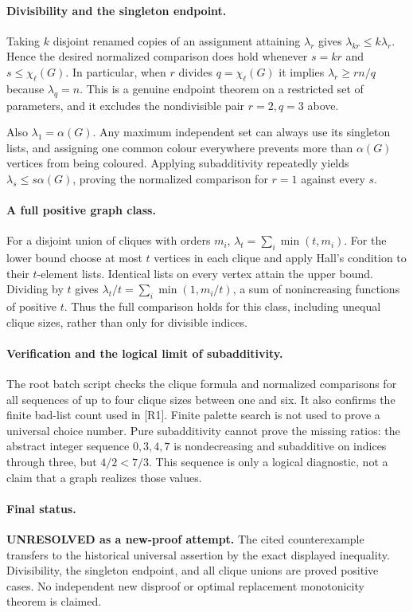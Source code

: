 \documentclass[11pt,a4paper]{article}
\begin{document}
\paragraph{Divisibility and the singleton endpoint.}
Taking $k$ disjoint renamed copies of an assignment attaining $\lambda_r$
gives $\lambda_{kr}\le k\lambda_r$. Hence the desired normalized comparison
does hold whenever $s=kr$ and $s\le\chi_\ell(G)$. In particular, when
$r$ divides $q=\chi_\ell(G)$ it implies $\lambda_r\ge rn/q$ because
$\lambda_q=n$. This is a genuine endpoint theorem on a restricted set
of parameters, and it excludes the nondivisible pair $r=2,q=3$ above.

Also $\lambda_1=\alpha(G)$. Any maximum independent set can always use
its singleton lists, and assigning one common colour everywhere prevents
more than $\alpha(G)$ vertices from being coloured. Applying subadditivity
repeatedly yields $\lambda_s\le s\alpha(G)$, proving the normalized
comparison for $r=1$ against every $s$.

\paragraph{A full positive graph class.}
For a disjoint union of cliques with orders $m_i$,
$\lambda_t=\sum_i\min(t,m_i)$. For the lower bound choose at most $t$
vertices in each clique and apply Hall's condition to their $t$-element
lists. Identical lists on every vertex attain the upper bound. Dividing
by $t$ gives $\lambda_t/t=\sum_i\min(1,m_i/t)$, a sum of nonincreasing
functions of positive $t$. Thus the full comparison holds for this class,
including unequal clique sizes, rather than only for divisible indices.

\paragraph{Verification and the logical limit of subadditivity.}
The root batch script checks the clique formula and normalized comparisons
for all sequences of up to four clique sizes between one and six.
It also confirms the finite bad-list count used in [R1]. Finite palette
search is not used to prove a universal choice number.
Pure subadditivity cannot prove the missing ratios: the abstract integer
sequence $0,3,4,7$ is nondecreasing and subadditive on indices through
three, but $4/2<7/3$. This sequence is only a logical diagnostic, not a
claim that a graph realizes those values.

\paragraph{Final status.}
\textbf{UNRESOLVED as a new-proof attempt.} The cited counterexample
transfers to the historical universal assertion by the exact displayed
inequality. Divisibility, the singleton endpoint, and all clique unions
are proved positive cases. No independent new disproof or optimal
replacement monotonicity theorem is claimed.
\end{document}
